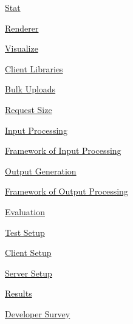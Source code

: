 \documentclass[10pt,a4paper,english]{article}
\begin{document}
\begin{list}{}{}
\begin{list}{}{}
\begin{list}{}{}
\begin{list}{}{}
\item {} \href{\#stat}{Stat}

\item {} \href{\#renderer}{Renderer}

\item {} \href{\#visualize}{Visualize}

\end{list}

\end{list}

\item {} \href{\#client-libraries}{Client Libraries}
\begin{list}{}{}
\item {} \href{\#bulk-uploads}{Bulk Uploads}

\item {} \href{\#request-size}{Request Size}

\end{list}

\item {} \href{\#input-processing}{Input Processing}
\begin{list}{}{}
\item {} \href{\#framework-of-input-processing}{Framework of Input Processing}

\end{list}

\item {} \href{\#output-generation}{Output Generation}
\begin{list}{}{}
\item {} \href{\#framework-of-output-processing}{Framework of Output Processing}

\end{list}

\end{list}

\item {} \href{\#evaluation}{Evaluation}
\begin{list}{}{}
\item {} \href{\#test-setup}{Test Setup}

\item {} \href{\#client-setup}{Client Setup}

\item {} \href{\#server-setup}{Server Setup}

\item {} \href{\#results}{Results}

\item {} \href{\#developer-survey}{Developer Survey}


\end{list}
\end{list}
\end{document}
